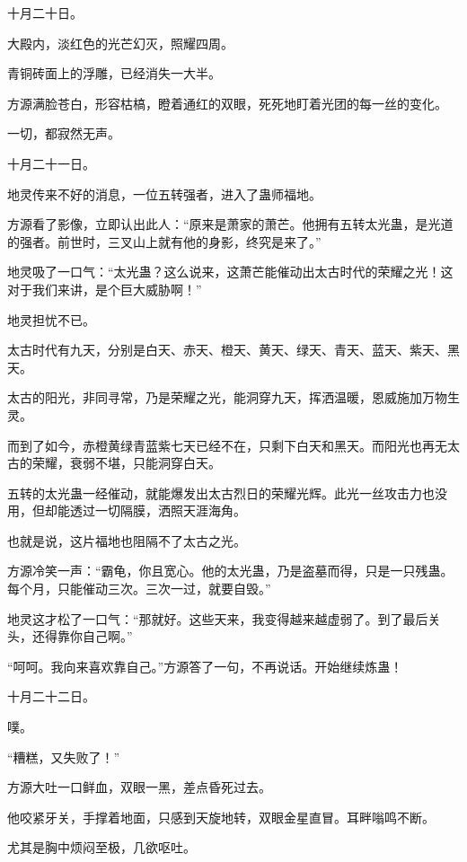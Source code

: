 
\begin{this_body}



十月二十日。

大殿内，淡红色的光芒幻灭，照耀四周。

青铜砖面上的浮雕，已经消失一大半。

方源满脸苍白，形容枯槁，瞪着通红的双眼，死死地盯着光团的每一丝的变化。

一切，都寂然无声。

十月二十一日。

地灵传来不好的消息，一位五转强者，进入了蛊师福地。

方源看了影像，立即认出此人：“原来是萧家的萧芒。他拥有五转太光蛊，是光道的强者。前世时，三叉山上就有他的身影，终究是来了。”

地灵吸了一口气：“太光蛊？这么说来，这萧芒能催动出太古时代的荣耀之光！这对于我们来讲，是个巨大威胁啊！”

地灵担忧不已。

太古时代有九天，分别是白天、赤天、橙天、黄天、绿天、青天、蓝天、紫天、黑天。

太古的阳光，非同寻常，乃是荣耀之光，能洞穿九天，挥洒温暖，恩威施加万物生灵。

而到了如今，赤橙黄绿青蓝紫七天已经不在，只剩下白天和黑天。而阳光也再无太古的荣耀，衰弱不堪，只能洞穿白天。

五转的太光蛊一经催动，就能爆发出太古烈日的荣耀光辉。此光一丝攻击力也没用，但却能透过一切隔膜，洒照天涯海角。

也就是说，这片福地也阻隔不了太古之光。

方源冷笑一声：“霸龟，你且宽心。他的太光蛊，乃是盗墓而得，只是一只残蛊。每个月，只能催动三次。三次一过，就要自毁。”

地灵这才松了一口气：“那就好。这些天来，我变得越来越虚弱了。到了最后关头，还得靠你自己啊。”

“呵呵。我向来喜欢靠自己。”方源答了一句，不再说话。开始继续炼蛊！

十月二十二日。

噗。

“糟糕，又失败了！”

方源大吐一口鲜血，双眼一黑，差点昏死过去。

他咬紧牙关，手撑着地面，只感到天旋地转，双眼金星直冒。耳畔嗡鸣不断。

尤其是胸中烦闷至极，几欲呕吐。


\end{this_body}
